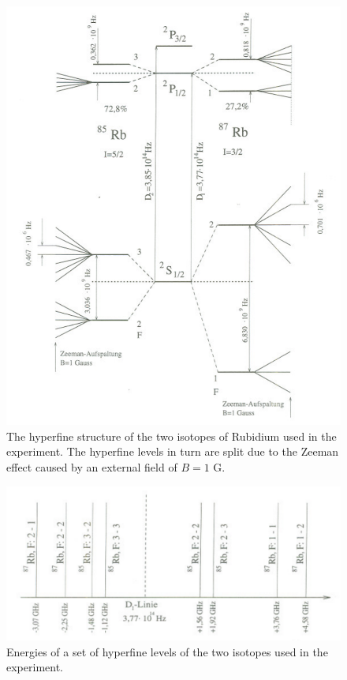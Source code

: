 \begin{figure}[H]
\centering
\includegraphics[width=1.0\linewidth]{graphics/hyperfinestructure}
\caption[Hyperfine structure of Rubidium]{The hyperfine structure of the two isotopes of Rubidium used in the experiment. The hyperfine levels in turn are split due to the Zeeman effect caused by an external field of $B=1$ G. \cite{staatsex}}
\label{fig:hyperfinestructure}
\end{figure}

\begin{figure}[H]
\centering
\includegraphics[width=1.0\linewidth]{graphics/hfslevels}
\caption[Hyperfine structure energies]{Energies of a set of hyperfine levels of the two isotopes used in the experiment. \cite{staatsex}}
\label{fig:hfslevels}
\end{figure}

